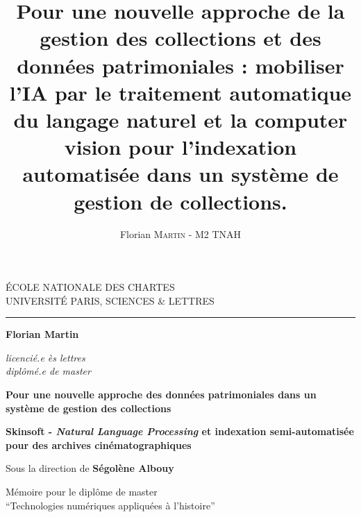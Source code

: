 \documentclass[12pt,twoside]{book}
\author{Florian \textsc{Martin} - M2 TNAH}
\title{Pour une nouvelle approche de la gestion des collections et des données patrimoniales : mobiliser l’IA par le traitement automatique du langage naturel et la computer vision pour l’indexation automatisée dans un système de gestion de collections.}
\begin{document}
	\begin{titlepage}
		\begin{center}
			
			\bigskip
			
			\begin{large}				
				ÉCOLE NATIONALE DES CHARTES\\
				UNIVERSITÉ PARIS, SCIENCES \& LETTRES
			\end{large}
			\begin{center}\rule{2cm}{0.02cm}\end{center}
			
			\bigskip
			\bigskip
			\bigskip
			\begin{Large}
				\textbf{Florian Martin}\\
			\end{Large}
			\begin{normalsize} \textit{licencié.e ès lettres}\\
				\textit{diplômé.e de master}
			\end{normalsize}
			
			\bigskip
			\bigskip
			\bigskip
			
			\begin{Huge}
				\textbf{ Pour une nouvelle approche des données patrimoniales dans un système de gestion des collections }\\ %
			\end{Huge}
			\bigskip
			\bigskip
			\begin{LARGE}
				\textbf{Skinsoft - \textit{Natural Language Processing} et indexation semi-automatisée pour des archives cinématographiques}\\  %
			\end{LARGE}
			
			\bigskip
			\bigskip
			\bigskip
			\begin{large}
				Sous la direction de \textbf{Ségolène Albouy}
			\end{large}
			\vfill
			
			\begin{large}
				Mémoire 
				pour le diplôme de master \\
				\enquote{Technologies numériques appliquées à l'histoire} \\
			\end{large}
			
		\end{center}
	\end{titlepage}
\end{document}
